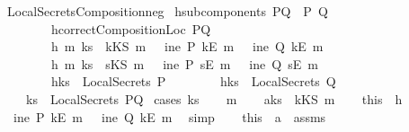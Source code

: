 \begin{isabellebody}
\ LocalSecretsComposition{\isacharunderscore}neg{}{\isacharcolon}\isanewline
{}\ h{}{\isacharcolon}{\isachardoublequoteopen}subcomponents\ PQ\ {\isacharequal}\ {\isacharbraceleft}P{\isacharcomma}\ Q{\isacharbraceright}{\isachardoublequoteclose}\isanewline
\ \ \ \ \ \ \ \ h{}{\isacharcolon}{\isachardoublequoteopen}correctCompositionLoc\ PQ{\isachardoublequoteclose}\isanewline
\ \ \ \ \ \ \ \ h{}{\isacharcolon}{\isachardoublequoteopen}{\isasymforall}\ m{\isachardot}\ ks\ {\isacharequal}\ kKS\ m\ {\isasymlongrightarrow}\ {\isacharparenleft}{\isasymnot}\ ine\ P\ {\isacharparenleft}kE\ m{\isacharparenright}\ {\isasymand}\ {\isasymnot}\ ine\ Q\ {\isacharparenleft}kE\ m{\isacharparenright}{\isacharparenright}{\isachardoublequoteclose}\ \isanewline
\ \ \ \ \ \ \ \ h{}{\isacharcolon}{\isachardoublequoteopen}{\isasymforall}\ m{\isachardot}\ ks\ {\isacharequal}\ sKS\ m\ {\isasymlongrightarrow}\ {\isacharparenleft}{\isasymnot}\ ine\ P\ {\isacharparenleft}sE\ m{\isacharparenright}\ {\isasymand}\ {\isasymnot}\ ine\ Q\ {\isacharparenleft}sE\ m{\isacharparenright}{\isacharparenright}{\isachardoublequoteclose}\isanewline
\ \ \ \ \ \ \ \ h{}{\isacharcolon}{\isachardoublequoteopen}ks\ {\isasymnotin}\ LocalSecrets\ P{\isachardoublequoteclose}\isanewline
\ \ \ \ \ \ \ \ h{}{\isacharcolon}{\isachardoublequoteopen}ks\ {\isasymnotin}\ LocalSecrets\ Q{\isachardoublequoteclose}\isanewline
{}\ \ \ \ {\isachardoublequoteopen}ks\ {\isasymnotin}\ LocalSecrets\ PQ{\isachardoublequoteclose}\isanewline
%
\isadelimproof
%
\endisadelimproof
%
\isatagproof
{}\isamarkupfalse%
\ {\isacharparenleft}cases\ {\isachardoublequoteopen}ks{\isachardoublequoteclose}{\isacharparenright}\isanewline
\ \ \isamarkupfalse%
\ m\isanewline
\ \ \isamarkupfalse%
\ a{}{\isacharcolon}{\isachardoublequoteopen}ks\ {\isacharequal}\ kKS\ m{\isachardoublequoteclose}\isanewline
\ \ \isamarkupfalse%
\ this\ \ h{}\ \isamarkupfalse%
\ {\isachardoublequoteopen}{\isasymnot}\ ine\ P\ {\isacharparenleft}kE\ m{\isacharparenright}\ {\isasymand}\ {\isasymnot}\ ine\ Q\ {\isacharparenleft}kE\ m{\isacharparenright}{\isachardoublequoteclose}\ \isamarkupfalse%
\ simp\isanewline
\ \ \isamarkupfalse%
\ this\ \ a{}\ \ assms\ \isamarkupfalse%

\end{isabellebody}
